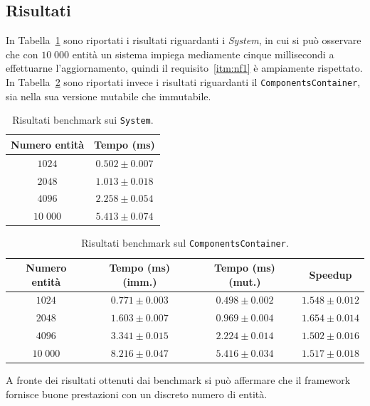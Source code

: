 \subsection{Risultati}\label{subsec:risultati}
In Tabella~\ref{tab:system-benchmark} sono riportati i risultati riguardanti i \textit{System}, in cui si può osservare
che con $10\;000$ entità un sistema impiega mediamente cinque millisecondi a effettuarne l'aggiornamento, quindi il
requisito~\ref{itm:nf1} è ampiamente rispettato.
In Tabella~\ref{tab:componentscontainer-benchmark} sono riportati invece i risultati riguardanti il
\texttt{ComponentsContainer}, sia nella sua versione mutabile che immutabile.

\begin{table}[htp]
    \centering
    \begin{tabular}{c c}
        \toprule
        Numero entità & Tempo (ms) \\ \midrule
        $1024$ & $0.502 \pm 0.007$ \\
        $2048$ & $1.013 \pm 0.018$ \\
        $4096$ & $2.258 \pm 0.054$ \\
        $10\;000$ & $5.413 \pm 0.074$ \\
        \bottomrule
    \end{tabular}
    \caption{Risultati benchmark sui \texttt{System}.}\label{tab:system-benchmark}
\end{table}

\begin{table}[htp]
    \centering
    \begin{tabular}{c c c c}
        \toprule
        Numero entità & Tempo (ms) (imm.) & Tempo (ms) (mut.) & Speedup \\ \midrule
        $1024$ & $0.771 \pm 0.003$ & $0.498 \pm 0.002$ & $1.548 \pm 0.012$ \\
        $2048$ & $1.603 \pm 0.007$ & $0.969 \pm 0.004$ & $1.654 \pm 0.014$ \\
        $4096$ & $3.341 \pm 0.015$ & $2.224 \pm 0.014$ & $1.502 \pm 0.016$ \\
        $10\;000$ & $8.216 \pm 0.047$ & $5.416 \pm 0.034$ & $1.517 \pm 0.018$ \\
        \bottomrule
    \end{tabular}
    \caption{Risultati benchmark sul \texttt{ComponentsContainer}.}\label{tab:componentscontainer-benchmark}
\end{table}

A fronte dei risultati ottenuti dai benchmark si può affermare che il framework fornisce buone prestazioni con un
discreto numero di entità.


